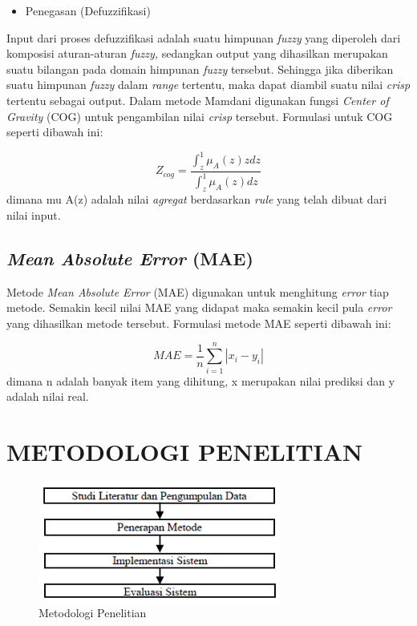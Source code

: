 \documentclass[a4paper]{article}
\begin{document}
\begin{multicols}{2}
\begin{itemize}
    \item Penegasan (Defuzzifikasi)
\end{itemize}

\par Input dari proses defuzzifikasi adalah suatu himpunan \textit{fuzzy} yang diperoleh dari komposisi aturan-aturan \textit{fuzzy,} sedangkan output yang dihasilkan merupakan suatu bilangan pada domain himpunan \textit{fuzzy} tersebut. Sehingga jika diberikan suatu himpunan \textit{fuzzy} dalam \textit{range} tertentu, maka dapat diambil suatu nilai \textit{crisp} tertentu sebagai output. Dalam metode Mamdani digunakan fungsi \textit{Center of Gravity} (COG) untuk pengambilan nilai \textit{crisp} tersebut. Formulasi untuk COG seperti dibawah ini:

\begin{equation}
    Z_{cog} = \frac{\int_{z}^{1}\mu_{A}(z)zdz}{\int_{z}^{1}\mu_{A}(z)dz}
\end{equation}
dimana mu A(z) adalah nilai \textit{agregat} berdasarkan \textit{rule} yang telah dibuat dari nilai input.

\subsection{\textit{Mean Absolute Error} (MAE)}

\par Metode \textit{Mean Absolute Error} (MAE) digunakan untuk menghitung \textit{error} tiap metode. Semakin kecil nilai MAE yang didapat maka semakin kecil pula \textit{error} yang dihasilkan metode tersebut. Formulasi metode MAE seperti dibawah ini:

\begin{equation}
   MAE = \frac{1}{n}\sum_{i=1}^{n} \left\lvert x_{i}-y_{i} \right\rvert
\end{equation}
dimana n adalah banyak item yang dihitung, x merupakan nilai prediksi dan y adalah nilai real.

\section{METODOLOGI PENELITIAN}

\begin{figure}[H]
    \centering
    \includegraphics[width=8cm]{gambar1metodologipenelitian.png}
    \caption{Metodologi Penelitian}
    \label{gb1}
\end{figure}


\end{multicols}
\end{document}
